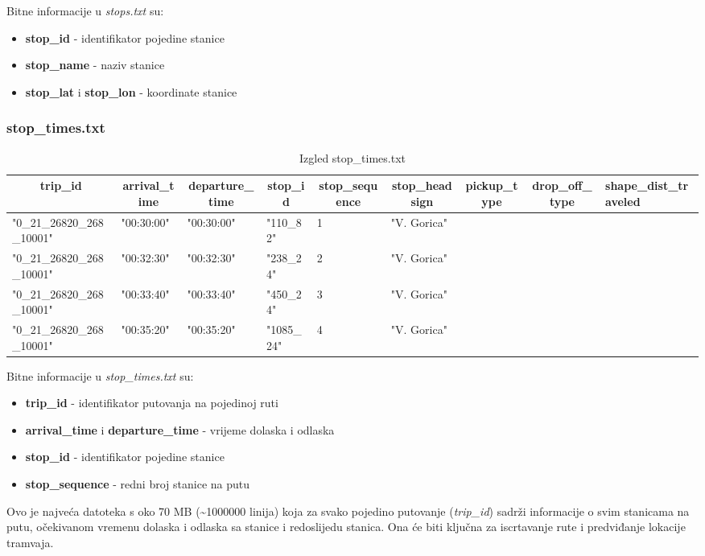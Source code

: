 \documentclass[zavrsnirad]{fer}
\begin{document}
Bitne informacije u \textit{stops.txt} su:
\begin{itemize}
	\item \textbf{stop\_id} - identifikator pojedine stanice
	\item \textbf{stop\_name} - naziv stanice
	\item \textbf{stop\_lat} i \textbf{stop\_lon} - koordinate stanice
\end{itemize}


\subsubsection{stop\_times.txt}

\begin{table}[htb]
	\begin{adjustbox}{width=\columnwidth,center}
		\begin{tabular}{l|l|l|l|l|l|l|l|l}
			\hline
			\multicolumn{1}{c|}{\textbf{trip\_id}} & \multicolumn{1}{c|}{\textbf{arrival\_time}} & \multicolumn{1}{c|}{\textbf{departure\_time}} & \multicolumn{1}{c|}{\textbf{stop\_id}} & \multicolumn{1}{c|}{\textbf{stop\_sequence}} & \multicolumn{1}{c|}{\textbf{stop\_headsign}} & \multicolumn{1}{c|}{\textbf{pickup\_type}} & \multicolumn{1}{c|}{\textbf{drop\_off\_type}} & \textbf{shape\_dist\_traveled} \\ \hline
			"0\_21\_26820\_268\_10001" & "00:30:00" & "00:30:00" & "110\_82" & 1 & "V. Gorica" &  &  &  \\ \hline
			"0\_21\_26820\_268\_10001" & "00:32:30" & "00:32:30" & "238\_24" & 2 & "V. Gorica" &  &  &  \\ \hline
			"0\_21\_26820\_268\_10001" & "00:33:40" & "00:33:40" & "450\_24" & 3 & "V. Gorica" &  &  &  \\ \hline
			"0\_21\_26820\_268\_10001" & "00:35:20" & "00:35:20" & "1085\_24" & 4 & "V. Gorica" &  &  &  \\ \hline
		\end{tabular}
	\end{adjustbox}
	\caption{Izgled stop\_times.txt}
	\label{tbl:stop_times}
\end{table}

Bitne informacije u \textit{stop\_times.txt} su:
\begin{itemize}
	\item \textbf{trip\_id} - identifikator putovanja na pojedinoj ruti
	\item \textbf{arrival\_time} i \textbf{departure\_time} - vrijeme dolaska i odlaska
	\item \textbf{stop\_id} - identifikator pojedine stanice
	\item \textbf{stop\_sequence} - redni broj stanice na putu
\end{itemize}
Ovo je najveća datoteka s oko 70 MB (\textasciitilde{}1000000 linija) koja za svako pojedino putovanje (\textit{trip\_id}) sadrži informacije o svim stanicama na putu, očekivanom vremenu dolaska i odlaska sa stanice i redoslijedu stanica. Ona će biti ključna za iscrtavanje rute i predviđanje lokacije tramvaja.
\newpage
\end{document}
